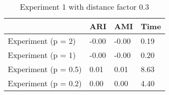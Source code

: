 \begin{table}
\centering
\caption{Experiment 1 with distance factor 0.3}
\begin{tabular}{llll}
\toprule
{} &    ARI &    AMI &  Time \\
\midrule
Experiment (p = 2)   &  -0.00 &  -0.00 &  0.19 \\
Experiment (p = 1)   &  -0.00 &  -0.00 &  0.20 \\
Experiment (p = 0.5) &   0.01 &   0.01 &  8.63 \\
Experiment (p = 0.2) &   0.00 &   0.00 &  4.40 \\
\bottomrule
\end{tabular}
\end{table}
